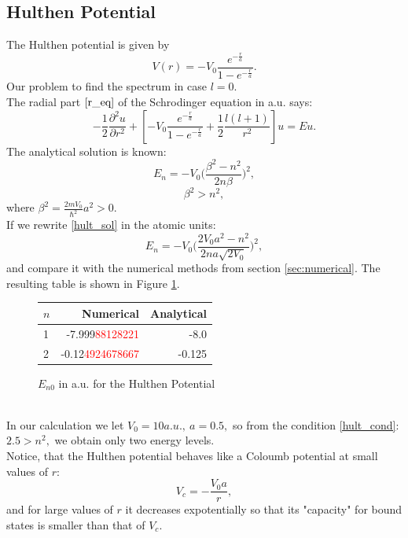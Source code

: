 \documentclass[a4paper, 11pt]{article}
\begin{document}
\subsection{Hulthen Potential}
The Hulthen potential is given by
\begin{equation}
    V(r) = - V_0 \frac{e^{-\frac{r}{a}}}{1 - e^{-\frac{r}{a}}}.
\end{equation}
Our problem to find the spectrum in case $l=0.$\\
The radial part $\eqref{r_eq}$ of the Schrodinger equation in a.u.  says:
$$-\frac{1}{2}\frac{\partial^2 u}{\partial r^2}+[- V_0 \frac{e^{-\frac{r}{a}}}{1 - e^{-\frac{r}{a}}} +\frac{1}{2}\frac{l(l+1)}{r^2}]u = Eu.$$
The analytical solution is known:
\begin{equation}\label{hult_sol}
	E_n = -V_0\bigg(\frac{\beta^2 - n^2}{2n\beta}\bigg)^2,
\end{equation}
\begin{equation}\label{hult_cond}
	\beta^2 > n^2, 
\end{equation}
where $\beta^2 = \displaystyle{\frac{2m V_0}{\hbar^2}a^2} > 0.$\\
If we rewrite \eqref{hult_sol} in the atomic units:
$$E_n = -V_0\bigg(\frac{2 V_0 a^2 - n^2}{2n a \sqrt{2V_0}}\bigg)^2,$$
and compare it with the numerical methods from section  \ref{sec:numerical}.  The resulting table is shown in Figure \ref{fig:Hult_spectrum}.
\begin{figure}[h!]
\centering
\begin{tabular}{lrr}
\toprule
\centering
$n$ &         Numerical &         Analytical \\
\midrule
1 & -7.999\textcolor{red}{88128221} & -8.0 \\
2 & -0.12\textcolor{red}{4924678667} & -0.125 \\
\bottomrule
\end{tabular}
\caption{$E_{n0}$ in a.u. for the Hulthen Potential}
\label{fig:Hult_spectrum}
\end{figure}\\
In our calculation we let $V_0 = 10 a.u.,~a = 0.5,$ so from the condition \ref{hult_cond}: $2.5 > n^2,$ we obtain only two energy levels.\\
Notice, that the Hulthen potential behaves like  a Coloumb potential at small values of $r:$
$$V_c = -\frac{V_0 a}{r},$$
and for large values of $r$ it decreases expotentially so that its "capacity" for bound states is smaller than that of $V_c.$
\end{document}
